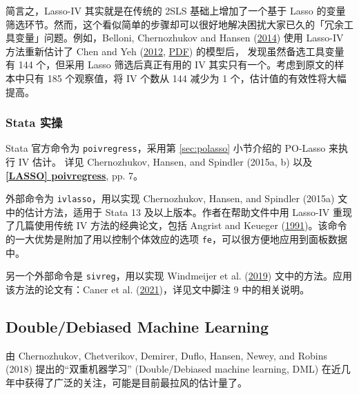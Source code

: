 {简言之，Lasso-IV 其实就是在传统的 2SLS 基础上增加了一个基于 Lasso 的变量筛选环节。然而，这个看似简单的步骤却可以很好地解决困扰大家已久的「冗余工具变量」问题。例如，Belloni, Chernozhukov and Hansen (\href{https://doi.org/10.1257/jep.28.2.29}{2014})
使用 Lasso-IV 方法重新估计了 Chen and Yeh (\href{https://papers.ssrn.com/sol3/papers.cfm?abstract_id=2977074}{2012}, \href{http://users.nber.org/~dlchen/papers/Growth_Under_the_Shadow_of_Expropriation.pdf}{PDF}) 的模型后，
发现虽然备选工具变量有 144 个，但采用 Lasso 筛选后真正有用的 IV 其实只有一个。考虑到原文的样本中只有 185 个观察值，将 IV 个数从 144 减少为 1 个，估计值的有效性将大幅提高。


\subsubsection{Stata 实操}
Stata 官方命令为 \texttt{poivregress}，采用第 \ref{sec:polasso} 小节介绍的 PO-Lasso 来执行 IV 估计。
详见 Chernozhukov, Hansen, and Spindler (2015a, b) 以及 \href{https://www.stata.com/manuals/lassopoivregress.pdf}{\bfseries{[\MakeUppercase{lasso}] poivregress}}, pp. 7。

外部命令为 \texttt{ivlasso}，用以实现  Chernozhukov, Hansen, and Spindler (2015a) 文中的估计方法，适用于 Stata 13 及以上版本。作者在帮助文件中用 Lasso-IV 重现了几篇使用传统 IV 方法的经典论文，包括 Angrist and Keueger (\href{http://sci-hub.ren/10.2307/2937954}{1991})。该命令的一大优势是附加了用以控制个体效应的选项 \texttt{fe}，可以很方便地应用到面板数据中。 

另一个外部命令是 \texttt{sivreg}，用以实现 Windmeijer et al. (\href{http://sci-hub.ren/10.1080/01621459.2018.1498346}{2019}) 文中的方法。应用该方法的论文有：Caner et al. (\href{http://sci-hub.ren/10.1016/j.iref.2021.07.010}{2021})，详见文中脚注 9 中的相关说明。

\subsection{Double/Debiased Machine Learning}\label{sec:lasso-DML}
由 Chernozhukov, Chetverikov, Demirer, Duflo, Hansen, Newey, and Robins (2018) 提出的“双重机器学习” (Double/Debiased machine learning, DML) 在近几年中获得了广泛的关注，可能是目前最拉风的估计量了。%

}
